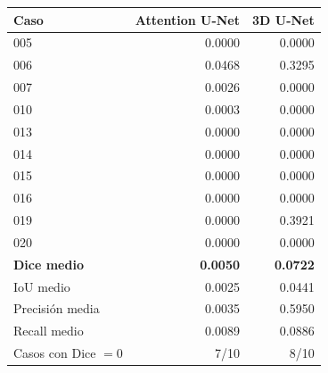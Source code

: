\begin{tabular}{lrr}
\toprule
Caso & Attention U-Net & 3D U-Net \\
\midrule
005 & 0.0000 & 0.0000 \\
006 & 0.0468 & 0.3295 \\
007 & 0.0026 & 0.0000 \\
010 & 0.0003 & 0.0000 \\
013 & 0.0000 & 0.0000 \\
014 & 0.0000 & 0.0000 \\
015 & 0.0000 & 0.0000 \\
016 & 0.0000 & 0.0000 \\
019 & 0.0000 & 0.3921 \\
020 & 0.0000 & 0.0000 \\
\midrule
\bfseries Dice medio & \bfseries 0.0050 & \bfseries 0.0722 \\
IoU medio & 0.0025 & 0.0441 \\
Precisión media & 0.0035 & 0.5950 \\
Recall medio & 0.0089 & 0.0886 \\
Casos con Dice $=0$ & 7/10 & 8/10 \\
\bottomrule
\end{tabular}%